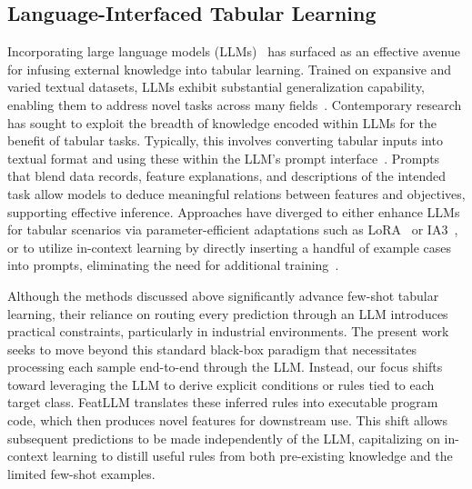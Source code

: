 \subsection{Language-Interfaced Tabular Learning} 

Incorporating large language models (LLMs)~\cite{anil2023palm,openai2023gpt4} has surfaced as an effective avenue for infusing external knowledge into tabular learning. Trained on expansive and varied textual datasets, LLMs exhibit substantial generalization capability, enabling them to address novel tasks across many fields~\cite{brown2020language}. Contemporary research has sought to exploit the breadth of knowledge encoded within LLMs for the benefit of tabular tasks. Typically, this involves converting tabular inputs into textual format and using these within the LLM's prompt interface~\cite{dinh2022lift,hegselmann2023tabllm,wang2023anypredict}. Prompts that blend data records, feature explanations, and descriptions of the intended task allow models to deduce meaningful relations between features and objectives, supporting effective inference. Approaches have diverged to either enhance LLMs for tabular scenarios via parameter-efficient adaptations such as LoRA~\cite{hu2021lora} or IA3~\cite{liu2022few}, or to utilize in-context learning by directly inserting a handful of example cases into prompts, eliminating the need for additional training~\cite{dinh2022lift,hegselmann2023tabllm,nam2023semi,slack2023tablet}.

Although the methods discussed above significantly advance few-shot tabular learning, their reliance on routing every prediction through an LLM introduces practical constraints, particularly in industrial environments. The present work seeks to move beyond this standard black-box paradigm that necessitates processing each sample end-to-end through the LLM. Instead, our focus shifts toward leveraging the LLM to derive explicit conditions or rules tied to each target class. \textsf{FeatLLM} translates these inferred rules into executable program code, which then produces novel features for downstream use. This shift allows subsequent predictions to be made independently of the LLM, capitalizing on in-context learning to distill useful rules from both pre-existing knowledge and the limited few-shot examples.

